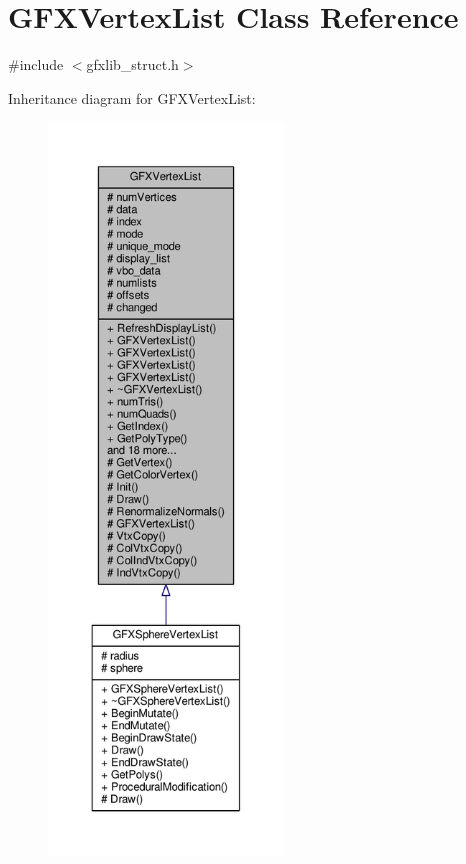 \hypertarget{classGFXVertexList}{}\section{G\+F\+X\+Vertex\+List Class Reference}
\label{classGFXVertexList}


{\ttfamily \#include $<$gfxlib\+\_\+struct.\+h$>$}



Inheritance diagram for G\+F\+X\+Vertex\+List\+:
\nopagebreak
\begin{figure}[H]
\begin{center}
\leavevmode
\includegraphics[height=550pt]{da/d83/classGFXVertexList__inherit__graph}
\end{center}
\end{figure}


